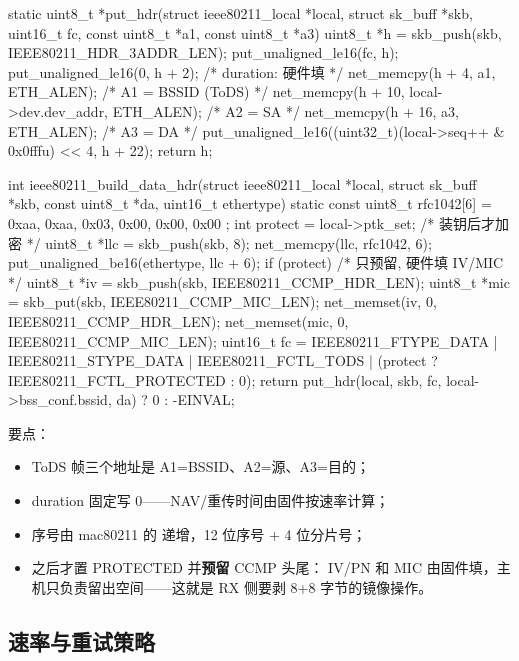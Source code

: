 \begin{ccode}
static uint8_t *put_hdr(struct ieee80211_local *local, struct sk_buff *skb,
                        uint16_t fc, const uint8_t *a1, const uint8_t *a3)
{
    uint8_t *h = skb_push(skb, IEEE80211_HDR_3ADDR_LEN);
    put_unaligned_le16(fc, h);
    put_unaligned_le16(0, h + 2);            /* duration: 硬件填 */
    net_memcpy(h + 4,  a1, ETH_ALEN);        /* A1 = BSSID (ToDS) */
    net_memcpy(h + 10, local->dev.dev_addr, ETH_ALEN);  /* A2 = SA */
    net_memcpy(h + 16, a3, ETH_ALEN);        /* A3 = DA */
    put_unaligned_le16((uint32_t)(local->seq++ & 0x0fffu) << 4, h + 22);
    return h;
}

int ieee80211_build_data_hdr(struct ieee80211_local *local,
                             struct sk_buff *skb, const uint8_t *da,
                             uint16_t ethertype)
{
    static const uint8_t rfc1042[6] = { 0xaa, 0xaa, 0x03, 0x00, 0x00, 0x00 };
    int protect = local->ptk_set;            /* 装钥后才加密 */
    uint8_t *llc = skb_push(skb, 8);
    net_memcpy(llc, rfc1042, 6);
    put_unaligned_be16(ethertype, llc + 6);
    if (protect) {                           /* 只预留, 硬件填 IV/MIC */
        uint8_t *iv  = skb_push(skb, IEEE80211_CCMP_HDR_LEN);
        uint8_t *mic = skb_put(skb, IEEE80211_CCMP_MIC_LEN);
        net_memset(iv, 0, IEEE80211_CCMP_HDR_LEN);
        net_memset(mic, 0, IEEE80211_CCMP_MIC_LEN);
    }
    uint16_t fc = IEEE80211_FTYPE_DATA | IEEE80211_STYPE_DATA |
                  IEEE80211_FCTL_TODS |
                  (protect ? IEEE80211_FCTL_PROTECTED : 0);
    return put_hdr(local, skb, fc, local->bss_conf.bssid, da) ? 0 : -EINVAL;
}
\end{ccode}

要点：

\begin{itemize}
  \item ToDS 帧三个地址是 A1=BSSID、A2=源、A3=目的；
  \item duration 固定写 0——NAV/重传时间由固件按速率计算；
  \item 序号由 mac80211 的  递增，12 位序号 + 4 位分片号；
  \item {} 之后才置 PROTECTED 并\textbf{预留} CCMP 头尾：
        IV/PN 和 MIC 由固件填，主机只负责留出空间——这就是 RX 侧要剥
        8+8 字节的镜像操作。
\end{itemize}

\subsection{速率与重试策略}

